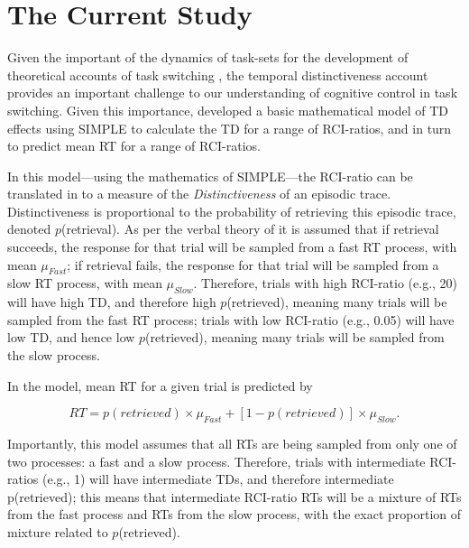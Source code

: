 \documentclass[a4paper, jou, natbib]{apa6}
\begin{document}
\section{The Current Study}

Given the important of the dynamics of task-sets for the development of theoretical accounts of task switching \citep[e.g.,][]{Altmann2008, Schneider2005}, the temporal distinctiveness account provides an important challenge to our understanding of cognitive control in task switching. Given this importance, \cite{Grange2015} developed a basic mathematical model of TD effects using SIMPLE \citep{Brown2007} to calculate the TD for a range of RCI-ratios, and in turn to predict mean RT for a range of RCI-ratios. 

In this model---using the mathematics of SIMPLE---the RCI-ratio can be translated in to a measure of the \emph{Distinctiveness} of an episodic trace. Distinctiveness is proportional to the probability of retrieving this episodic trace, denoted $p$(retrieval). As per the verbal theory of \cite{Horoufchin2011a} it is assumed that if retrieval succeeds, the response for that trial will be sampled from a fast RT process, with mean $\mu_{Fast}$; if retrieval fails, the response for that trial will be sampled from a slow RT process, with mean $\mu_{Slow}$. Therefore, trials with high RCI-ratio (e.g., 20) will have high TD, and therefore high $p$(retrieved), meaning many trials will be sampled from the fast RT process; trials with low RCI-ratio (e.g., 0.05) will have low TD, and hence low $p$(retrieved), meaning many trials will be sampled from the slow process.  

In the model, mean RT for a given trial is predicted by

\begin{equation}
RT = p(retrieved) \times \mu_{Fast} + [1 - p(retrieved)] \times \mu_{Slow}.
\label{eq:simpleMixture}
\end{equation}

Importantly, this model assumes that all RTs are being sampled from only one of two processes: a fast and a slow process. Therefore, trials with intermediate RCI-ratios (e.g., 1) will have intermediate TDs, and therefore intermediate p(retrieved); this means that intermediate RCI-ratio RTs will be a mixture of RTs from the fast process and RTs from the slow process, with the exact proportion of mixture related to $p$(retrieved). 
    
\end{document}
